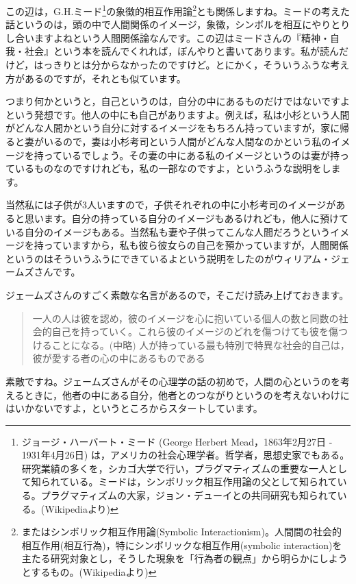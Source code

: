 \documentclass{ltjsbook}
\begin{document}
この辺は，G.H.ミード\footnote{ジョージ・ハーバート・ミード (George Herbert Mead，1863年2月27日 - 1931年4月26日) は，アメリカの社会心理学者。哲学者，思想史家でもある。研究業績の多くを，シカゴ大学で行い，プラグマティズムの重要な一人として知られている。ミードは，シンボリック相互作用論の父として知られている。プラグマティズムの大家，ジョン・デューイとの共同研究も知られている。(Wikipediaより)}の象徴的相互作用論\footnote{またはシンボリック相互作用論(Symbolic Interactionism)。人間間の社会的相互作用(相互行為)，特にシンボリックな相互作用(symbolic interaction)を主たる研究対象とし，そうした現象を「行為者の観点」から明らかにしようとするもの。(Wikipediaより)}とも関係しますね。ミードの考えた話というのは，頭の中で人間関係のイメージ，象徴，シンボルを相互にやりとりし合いますよねという人間関係論なんです。この辺はミードさんの『精神・自我・社会』という本\parencite{GHMead}を読んでくれれば，ぼんやりと書いてあります。私が読んだけど，はっきりとは分からなかったのですけど。とにかく，そういうふうな考え方があるのですが，それとも似ています。

つまり何かというと，自己というのは，自分の中にあるものだけではないですよという発想です。他人の中にも自己がありますよ。例えば，私は小杉という人間がどんな人間かという自分に対するイメージをもちろん持っていますが，家に帰ると妻がいるので，妻は小杉考司という人間がどんな人間なのかという私のイメージを持っているでしょう。その妻の中にある私のイメージというのは妻が持っているものなのですけれども，私の一部なのですよ，というふうな説明をします。

当然私には子供が3人いますので，子供それぞれの中に小杉考司のイメージがあると思います。自分の持っている自分のイメージもあるけれども，他人に預けている自分のイメージもある。当然私も妻や子供ってこんな人間だろうというイメージを持っていますから，私も彼ら彼女らの自己を預かっていますが，人間関係というのはそういうふうにできているよという説明をしたのがウィリアム・ジェームズさんです。

ジェームズさんのすごく素敵な名言があるので，そこだけ読み上げておきます。

\begin{quote}
    一人の人は彼を認め，彼のイメージを心に抱いている個人の数と同数の社会的自己を持っていく。これら彼のイメージのどれを傷つけても彼を傷つけることになる。(中略)
人が持っている最も特別で特異な社会的自己は，彼が愛する者の心の中にあるものである
\end{quote}

素敵ですね。ジェームズさんがその心理学の話の初めで，人間の心というのを考えるときに，他者の中にある自分，他者とのつながりというのを考えないわけにはいかないですよ，というところからスタートしています。
\end{document}
